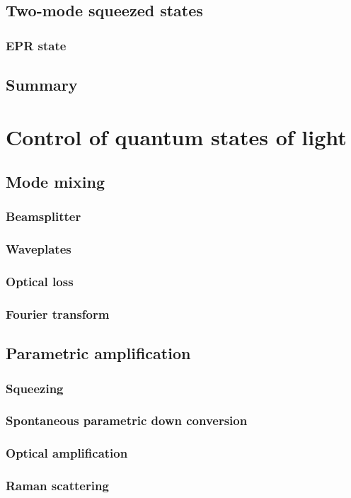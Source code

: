 \documentclass{book}
\begin{document}
\section{Two-mode squeezed states}
\subsection{EPR state}
\section{Summary}

\chapter{Control of quantum states of light}
\section{Mode mixing}
\subsection{Beamsplitter}
\subsection{Waveplates}
\subsection{Optical loss}
\subsection{Fourier transform}
\section{Parametric amplification}
\subsection{Squeezing}
\subsection{Spontaneous parametric down conversion}
\subsection{Optical amplification}
\subsection{Raman scattering}
\end{document}
